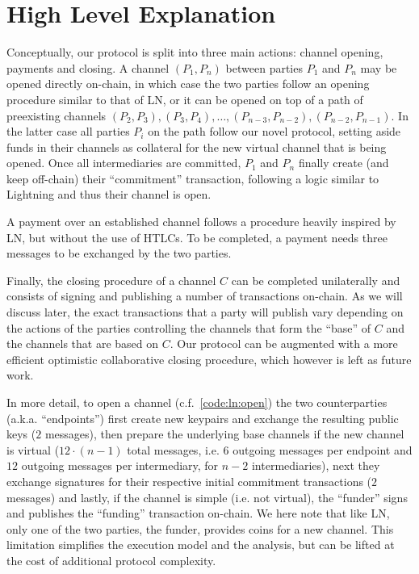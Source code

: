 \section{High Level Explanation}
  Conceptually, our protocol is split into three main actions: channel opening,
  payments and closing. A channel $(P_1, P_n)$ between parties $P_1$ and $P_n$
  may be opened directly on-chain, in which case the two parties follow an
  opening procedure similar to that of LN, or it can be opened on top of a path
  of preexisting channels $(P_2, P_3), (P_3, P_4), \dots, (P_{n-3}, P_{n-2}),
  (P_{n-2}, P_{n-1})$. In the latter case all parties $P_i$ on the path follow
  our novel protocol, setting aside funds in their channels as collateral for
  the new virtual channel that is being opened. Once all intermediaries are
  committed, $P_1$ and $P_n$ finally create (and keep off-chain) their
  ``commitment'' transaction, following a logic similar to Lightning and thus
  their channel is open.

  A payment over an established channel follows a procedure heavily inspired by
  LN, but without the use of HTLCs. To be completed, a payment needs three
  messages to be exchanged by the two parties.

  Finally, the closing procedure of a channel $C$ can be completed unilaterally
  and consists of signing and publishing a number of transactions on-chain. As
  we will discuss later, the exact transactions that a party will publish vary
  depending on the actions of the parties controlling the channels that form the
  ``base'' of $C$ and the channels that are based on $C$. Our protocol can be
  augmented with a more efficient optimistic collaborative closing procedure,
  which however is left as future work.

  In more detail, to open a channel (c.f.~\ref{code:ln:open}) the two
  counterparties (a.k.a. ``endpoints'') first create new keypairs and exchange
  the resulting public keys ($2$ messages), then prepare the underlying base
  channels if the new channel is virtual ($12 \cdot (n-1)$ total messages, i.e.
  $6$ outgoing messages per endpoint and $12$ outgoing messages per
  intermediary, for $n-2$ intermediaries), next they exchange signatures for
  their respective initial commitment transactions ($2$ messages) and lastly, if
  the channel is simple (i.e. not virtual), the ``funder'' signs and publishes
  the ``funding'' transaction on-chain.  We here note that like LN, only one of
  the two parties, the funder, provides coins for a new channel.  This
  limitation simplifies the execution model and the analysis, but can be lifted
  at the cost of additional protocol complexity.

